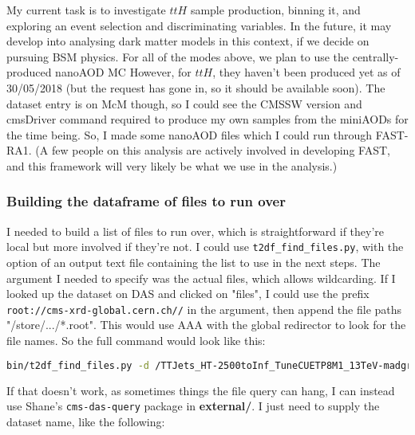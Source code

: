 My current task is to investigate $ttH$ sample production, binning it, and exploring an event selection and discriminating variables. In the future, it may develop into analysing dark matter models in this context, if we decide on pursuing BSM physics. For all of the modes above, we plan to use the centrally-produced nanoAOD MC However, for $ttH$, they haven't been produced yet as of 30/05/2018 (but the request has gone in, so it should be available soon). The dataset entry is on McM though, so I could see the CMSSW version and cmsDriver command required to produce my own samples from the miniAODs for the time being. So, I made some nanoAOD files which I could run through FAST-RA1. (A few people on this analysis are actively involved in developing FAST, and this framework will very likely be what we use in the analysis.)


\subsubsection{Building the dataframe of files to run over}

I needed to build a list of files to run over, which is straightforward if they're local but more involved if they're not. I could use \texttt{t2df\_find\_files.py}, with the option of an output text file containing the list to use in the next steps. The argument I needed to specify was the actual files, which allows wildcarding. If I looked up the dataset on DAS and clicked on "files", I could use the prefix \texttt{root://cms-xrd-global.cern.ch//} in the argument, then append the file paths "/store/.../*.root". This would use AAA with the global redirector to look for the file names. So the full command would look like this:

\begin{lstlisting}[belowskip=-0.7cm, language=sh, numbers=none]
bin/t2df_find_files.py -d /TTJets_HT-2500toInf_TuneCUETP8M1_13TeV-madgraphMLM-pythia8/RunIISummer16NanoAOD-PUMoriond17_05Feb2018_94X_mcRun2_asymptotic_v2_ext1-v1/NANOAODSIM -o file_list_ttJets_2500toInf.txt --mc root://cms-xrd-global.cern.ch///store/mc/RunIISummer16NanoAOD/TTJets_HT-2500toInf_TuneCUETP8M1_13TeV-madgraphMLM-pythia8/NANOAODSIM/PUMoriond17_05Feb2018_94X_mcRun2_asymptotic_v2_ext1-v1/00000/*.root
\end{lstlisting}

If that doesn't work, as sometimes things the file query can hang, I can instead use Shane's \texttt{cms-das-query} package in \textbf{external/}. I just need to supply the dataset name, like the following:

